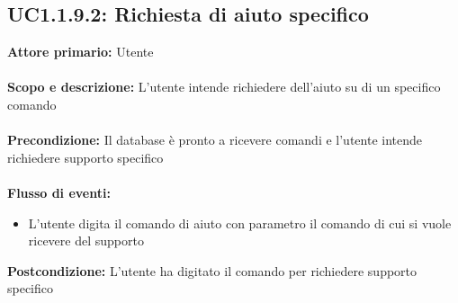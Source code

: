 \documentclass{scalatekids-article}
\begin{document}
\subsection{UC1.1.9.2: Richiesta di aiuto specifico}
\textbf{Attore primario:} Utente \\ \\
\textbf{Scopo e descrizione:} L’utente intende richiedere dell’aiuto su di un specifico comando\\ \\
\textbf{Precondizione:} Il database è pronto a ricevere comandi e l’utente intende richiedere supporto specifico\\ \\
\textbf{Flusso di eventi:}
\begin{itemize}
\item L’utente digita il comando di aiuto con parametro il comando di cui si vuole ricevere del supporto
\end{itemize}
\textbf{Postcondizione:} L’utente ha digitato il comando per richiedere supporto specifico
\end{document}
